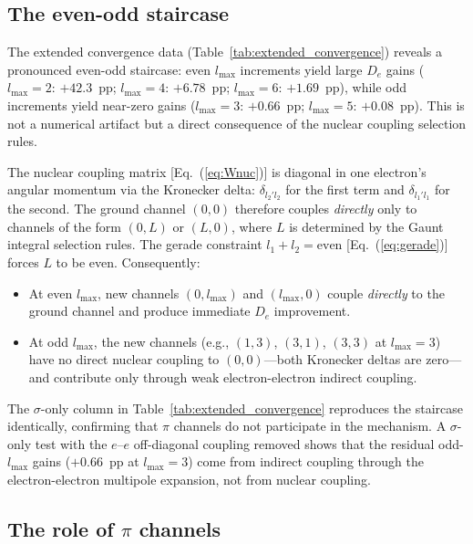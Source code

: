 \documentclass[aps,pra,twocolumn,superscriptaddress,longbibliography]{revtex4-2}
\begin{document}
\subsection{The even-odd staircase}
\label{sec:staircase}

The extended convergence data
(Table~\ref{tab:extended_convergence}) reveals a pronounced
even-odd staircase: even $l_{\max}$ increments yield large
$D_e$ gains ($l_{\max} = 2$: $+42.3$~pp; $l_{\max} = 4$:
$+6.78$~pp; $l_{\max} = 6$: $+1.69$~pp), while odd
increments yield near-zero gains ($l_{\max} = 3$: $+0.66$~pp;
$l_{\max} = 5$: $+0.08$~pp).  This is not a numerical artifact
but a direct consequence of the nuclear coupling selection rules.

The nuclear coupling matrix [Eq.~(\ref{eq:Wnuc})] is diagonal in
one electron's angular momentum via the Kronecker delta:
$\delta_{l_2' l_2}$ for the first term and $\delta_{l_1' l_1}$
for the second.  The ground channel $(0,0)$ therefore couples
\emph{directly} only to channels of the form $(0,L)$ or $(L,0)$,
where $L$ is determined by the Gaunt integral selection rules.
The gerade constraint $l_1 + l_2 = \text{even}$
[Eq.~(\ref{eq:gerade})] forces $L$ to be even.  Consequently:
\begin{itemize}
  \item At even $l_{\max}$, new channels $(0, l_{\max})$ and
    $(l_{\max}, 0)$ couple \emph{directly} to the ground channel
    and produce immediate $D_e$ improvement.
  \item At odd $l_{\max}$, the new channels
    (e.g., $(1,3)$, $(3,1)$, $(3,3)$ at $l_{\max} = 3$) have no
    direct nuclear coupling to $(0,0)$---both Kronecker deltas are
    zero---and contribute only through weak electron-electron
    indirect coupling.
\end{itemize}

The $\sigma$-only column in Table~\ref{tab:extended_convergence}
reproduces the staircase identically, confirming that $\pi$
channels do not participate in the mechanism.  A $\sigma$-only
test with the $e$--$e$ off-diagonal coupling removed shows that
the residual odd-$l_{\max}$ gains ($+0.66$~pp at $l_{\max} = 3$)
come from indirect coupling through the electron-electron
multipole expansion, not from nuclear coupling.

\subsection{The role of \texorpdfstring{$\pi$}{pi} channels}
\end{document}
